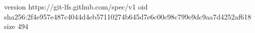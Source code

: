 version https://git-lfs.github.com/spec/v1
oid sha256:2f4e957e487c4044d4eb57110274b645d7e6c00c98c799e9dc9aa7d4252af618
size 494
